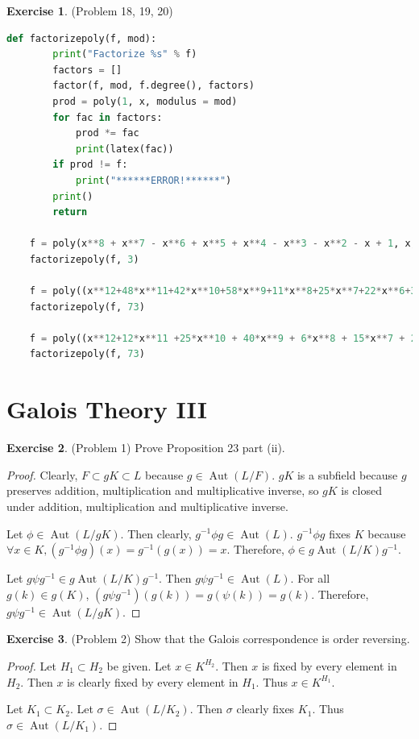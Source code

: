 \documentclass[12pt, psamsfonts]{amsart}
\theoremstyle{definition}
\newtheorem*{exer}{Exercise}
\theoremstyle{remark}
\DeclareMathOperator{\Aut}{Aut}
\numberwithin{equation}{section}
\begin{document}
\begin{exer}{(Problem 18, 19, 20)}
\begin{lstlisting}[language=python]
    def factorizepoly(f, mod):
        print("Factorize %s" % f)
        factors = []
        factor(f, mod, f.degree(), factors)
        prod = poly(1, x, modulus = mod)
        for fac in factors:
            prod *= fac
            print(latex(fac))
        if prod != f:
            print("******ERROR!******")
        print()
        return

    f = poly(x**8 + x**7 - x**6 + x**5 + x**4 - x**3 - x**2 - x + 1, x, modulus = 3)
    factorizepoly(f, 3)

    f = poly((x**12+48*x**11+42*x**10+58*x**9+11*x**8+25*x**7+22*x**6+30*x**5+34*x**4+16*x**3+62*x**2+21*x+27), x, modulus = 73)
    factorizepoly(f, 73)

    f = poly((x**12+12*x**11 +25*x**10 + 40*x**9 + 6*x**8 + 15*x**7 + 24*x**6+ 42*x**5 + 8*x**4 + 48*x**3 +68*x**2 + 50*x +68), x, modulus = 73)
    factorizepoly(f, 73)
  \end{lstlisting}
\end{exer}

\section{Galois Theory III}

\begin{exer}{(Problem 1)}
  Prove Proposition 23 part (ii).
\end{exer}

\begin{proof}
  Clearly, $F \subset gK \subset L$ because $g \in \Aut(L / F)$.
  $gK$ is a subfield because $g$ preserves addition, multiplication and multiplicative inverse, so $gK$ is closed under addition, multiplication and multiplicative inverse.

  Let $\phi \in \Aut(L/gK)$.
  Then clearly, $g^{-1}\phi g \in \Aut(L)$.
  $g^{-1}\phi g$ fixes $K$ because $\forall x \in K, (g^{-1}\phi g)(x) = g^{-1}(g(x)) = x$.
  Therefore, $\phi \in g\Aut(L/K)g^{-1}$.

  Let $g\psi g^{-1} \in g\Aut(L/K)g^{-1}$.
  Then $g\psi g^{-1} \in \Aut(L)$.
  For all $g(k) \in g(K)$, $(g\psi g^{-1})(g(k)) = g(\psi(k)) = g(k)$.
  Therefore, $g\psi g^{-1} \in \Aut(L/gK)$.
\end{proof}

\begin{exer}{(Problem 2)}
  Show that the Galois correspondence is order reversing.
\end{exer}

\begin{proof}
  Let $H_1 \subset H_2$ be given.
  Let $x \in K^{H_2}$.
  Then $x$ is fixed by every element in $H_2$.
  Then $x$ is clearly fixed by every element in $H_1$.
  Thus $x \in K^{H_1}$.

  Let $K_1 \subset K_2$.
  Let $\sigma \in \Aut(L/K_2)$.
  Then $\sigma$ clearly fixes $K_1$.
  Thus $\sigma \in \Aut(L/K_1)$.
\end{proof}
\end{document}
